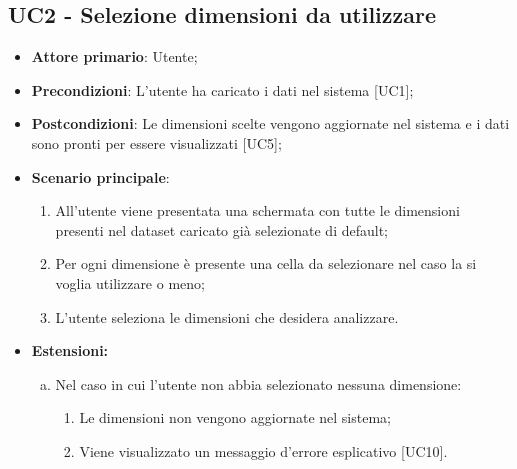 \subsection{UC2 - Selezione dimensioni da utilizzare}
\begin{itemize}
	\item \textbf{Attore primario}: Utente;
	\item \textbf{Precondizioni}: L'utente ha caricato i dati nel sistema [UC1];
	\item \textbf{Postcondizioni}: Le dimensioni scelte vengono aggiornate nel sistema e i dati sono pronti per essere visualizzati [UC5];
	\item \textbf{Scenario principale}:
		\begin{enumerate}
			\item All'utente viene presentata una schermata con tutte le dimensioni presenti nel dataset caricato già selezionate di default;
			\item Per ogni dimensione è presente una cella da selezionare nel caso la si voglia utilizzare o meno;
			\item L'utente seleziona le dimensioni che desidera analizzare.
		\end{enumerate}
	\item \textbf{Estensioni:}
		\begin{enumerate}[(a)]
			\item Nel caso in cui l'utente non abbia selezionato nessuna dimensione:
			\begin{enumerate}[1.]
				\item Le dimensioni non vengono aggiornate nel sistema;
				\item Viene visualizzato un messaggio d'errore esplicativo [UC10].
			\end{enumerate}
		\end{enumerate}
\end{itemize}
